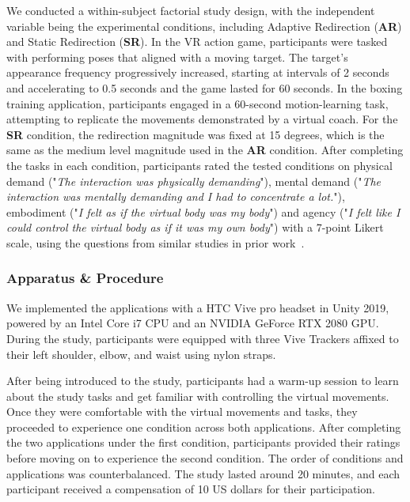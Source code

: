 We conducted a within-subject factorial study design, with the independent variable being the experimental conditions, including Adaptive Redirection (\textbf{AR}) and Static Redirection (\textbf{SR}).
In the VR action game, participants were tasked with performing poses that aligned with a moving target. 
The target’s appearance frequency progressively increased, starting at intervals of 2 seconds and accelerating to 0.5 seconds and the game lasted for 60 seconds.
In the boxing training application, participants engaged in a 60-second motion-learning task, attempting to replicate the movements demonstrated by a virtual coach.
For the \textbf{SR} condition, the redirection magnitude was fixed at 15 degrees, which is the same as the medium level magnitude used in the \textbf{AR} condition.
After completing the tasks in each condition, participants rated the tested conditions on physical demand ("\textit{The interaction was physically demanding}"), mental demand ("\textit{The interaction was mentally demanding and I had to concentrate a lot.}"), embodiment ("\textit{I felt as if the virtual body was my body}") and agency ("\textit{I felt like I could control the virtual body as if it was my own body}") with a 7-point Likert scale, using the questions from similar studies in prior work~\cite{peck2021avatar, feick2023investigating}.


\subsubsection{Apparatus \& Procedure}

We implemented the applications with a HTC Vive pro headset in Unity 2019, powered by an Intel Core i7 CPU and an NVIDIA GeForce RTX 2080 GPU. 
During the study, participants were equipped with three Vive Trackers affixed to their left shoulder, elbow, and waist using nylon straps.

After being introduced to the study, participants had a warm-up session to learn about the study tasks and get familiar with controlling the virtual movements.
Once they were comfortable with the virtual movements and tasks, they proceeded to experience one condition across both applications.
After completing the two applications under the first condition, participants provided their ratings before moving on to experience the second condition. 
The order of conditions and applications was counterbalanced.
The study lasted around 20 minutes, and each participant received a compensation of 10 US dollars for their participation.

